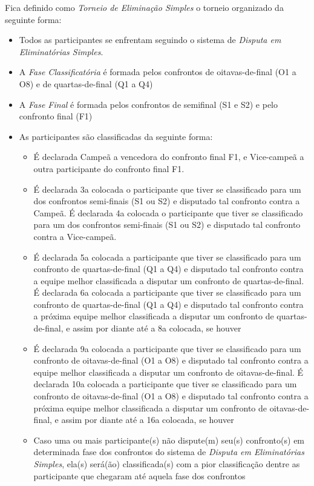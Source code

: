 \noindent
Fica definido como \textit{Torneio de Eliminação Simples} o torneio organizado da seguinte forma:
\begin{itemize}[noitemsep]
	\item Todos as participantes se enfrentam seguindo o sistema de \textit{Disputa em Eliminatórias Simples}.
	\item A \textit{Fase Classificatória} é formada pelos confrontos de oitavas-de-final (O1 a O8) e de quartas-de-final (Q1 a Q4)
	\item A \textit{Fase Final} é formada pelos confrontos de semifinal (S1 e S2) e pelo confronto final (F1)
	\item As participantes são classificadas da seguinte forma:
	\begin{itemize}[noitemsep]
		\item É declarada Campeã a vencedora do confronto final F1, e Vice-campeã a outra participante do confronto final F1.
		\item É declarada 3a colocada o participante que tiver se classificado para um dos confrontos semi-finais (S1 ou S2) e disputado tal confronto contra a Campeã. É declarada 4a colocada o participante que tiver se classificado para um dos confrontos semi-finais (S1 ou S2) e disputado tal confronto contra a Vice-campeã.
		\item É declarada 5a colocada a participante que tiver se classificado para um confronto de quartas-de-final (Q1 a Q4) e disputado tal confronto contra a equipe melhor classificada a disputar um confronto de quartas-de-final. É declarada 6a colocada a participante que tiver se classificado para um confronto de quartas-de-final (Q1 a Q4) e disputado tal confronto contra a próxima equipe melhor classificada a disputar um confronto de quartas-de-final, e assim por diante até a 8a colocada, se houver
		\item É declarada 9a colocada a participante que tiver se classificado para um confronto de oitavas-de-final (O1 a O8) e disputado tal confronto contra a equipe melhor classificada a disputar um confronto de oitavas-de-final. É declarada 10a colocada a participante que tiver se classificado para um confronto de oitavas-de-final (O1 a O8) e disputado tal confronto contra a próxima equipe melhor classificada a disputar um confronto de oitavas-de-final, e assim por diante até a 16a colocada, se houver
		\item Caso uma ou mais participante(s) não dispute(m) seu(s) confronto(s) em determinada fase dos confrontos do sistema de \textit{Disputa em Eliminatórias Simples}, ela(s) será(ão) classificada(s) com a pior classificação dentre as participante que chegaram até aquela fase dos confrontos
	\end{itemize}
\end{itemize}

